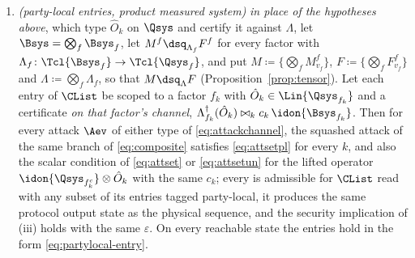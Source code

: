 \begin{theorem}
\begin{enumerate}[label=(\roman*),leftmargin=3.0em]
  form $\tr_{\Qsys}[(\idon{A}\otimes\hat O_k)\sigma]\bowtie_kc_k\,\tau_A$
  holds on every reachable state whose marginal on $A$ is $\tau_A$.
\item \emph{(party-local entries, product measured system)} \emph{in place
  of the hypotheses above}, which type $\hat O_k$ on $\Qsys$ and certify it
  against $\Lambda$, let
  $\Bsys=\bigotimes_f\Bsys_f$, let $M^{f}\dsq_{\Lambda_f}F^{f}$ for every
  factor with $\Lambda_f\colon\Tcl{\Bsys_f}\to\Tcl{\Qsys_f}$, and put
  $M\coloneqq\{\bigotimes_fM^{f}_{v_f}\}$, $F\coloneqq\{\bigotimes_fF^{f}_{v_f}\}$
  and $\Lambda\coloneqq\bigotimes_f\Lambda_f$, so that $M\dsq_{\Lambda}F$
  (Proposition~\ref{prop:tensor}). Let each entry of $\CList$ be scoped to a
  factor $f_k$ with $\hat O_k\in\Lin{\Qsys_{f_k}}$ and a certificate
  \emph{on that factor's channel},
  $\Lambda_{f_k}^{\dagger}(\hat O_k)\bowtie_kc_k\,\idon{\Bsys_{f_k}}$. Then
  for every attack $\Aev$ of either type of \eqref{eq:attackchannel}, the
  squashed attack of the same branch of \eqref{eq:composite} satisfies
  \eqref{eq:attsetpl} for every $k$, and also the scalar condition of
  \eqref{eq:attset} or \eqref{eq:attsetun} for the lifted operator
  $\idon{\Qsys_{f_k^c}}\otimes\hat O_k$ with the same $c_k$; every
   is admissible for $\CList$ read with any subset of its entries
  tagged party-local, it produces the same protocol output state
  as the physical sequence, and the security implication of (iii) holds
  with the same $\varepsilon$. On every reachable state the entries hold in
  the form \eqref{eq:partylocal-entry}.
\end{enumerate}
\end{theorem}

